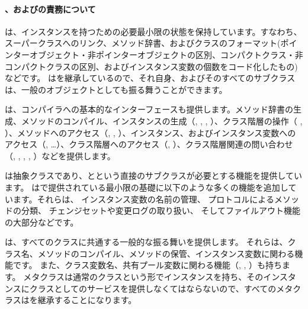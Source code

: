 \documentclass[a4paper,10pt,twoside]{book}
\begin{document}

\paragraph{、およびの責務について}
は、インスタンスを持つための必要最小限の状態を保持しています。すなわち、スーパークラスへのリンク、メソッド辞書、およびクラスのフォーマット(ポインターオブジェクト・非ポインターオブジェクトの区別、コンパクトクラス・非コンパクトクラスの区別、およびインスタンス変数の個数をコード化したもの)などです。
はを継承しているので、それ自身、およびそのすべてのサブクラスは、一般のオブジェクトとしても振る舞うことができます。

は、コンパイラへの基本的なインターフェースも提供します。メソッド辞書の生成、メソッドのコンパイル、インスタンスの生成（\ie {}, , , ）、クラス階層の操作（\ie {} , ）、メソッドへのアクセス（\ie {}, , ）、インスタンス、およびインスタンス変数へのアクセス（\ie {}, \ldots）、クラス階層へのアクセス（\ie {}, ）、クラス階層関連の問い合わせ（\ie {}, , , , ）などを提供します。

は抽象クラスであり、とという直接のサブクラスが必要とする機能を提供しています。
はで提供されている最小限の基礎に以下のような多くの機能を追加しています。それらは、
インスタンス変数の名前の管理、
プロトコルによるメソッドの分類、
チェンジセットや変更ログの取り扱い、
そしてファイルアウト機能の大部分などです。

は、すべてのクラスに共通する一般的な振る舞いを提供します。
それらは、クラス名、メソッドのコンパイル、メソッドの保管、インスタンス変数に関わる機能です。
また、クラス変数名、共有プール変数に関わる機能（, , ）も持ちます。
メタクラスは通常のクラスという形でインスタンスを持ち、そのインスタンスにクラスとしてのサービスを提供しなくてはならないので、すべてのメタクラスはを継承することになります。
\end{document}
